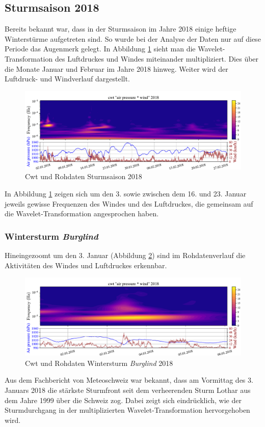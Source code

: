 \begin{refsection}
\newpage


\subsection{Sturmsaison 2018}
Bereits bekannt war, dass in der Sturmsaison im Jahre 2018 einige heftige Winterstürme aufgetreten sind.
So wurde bei der Analyse der Daten nur auf diese Periode das Augenmerk gelegt. 
In Abbildung \ref{fig:cwt_storm} \space sieht man die Wavelet-Transformation des Luftdruckes und Windes miteinander multipliziert.
Dies über die Monate Januar und Februar im Jahre 2018 hinweg.
Weiter wird der Luftdruck- und Windverlauf dargestellt.
 
\begin{figure}[h]
	\centering
	\includegraphics[width=1\textwidth]{papers/wwt/images/storm_airp_wind.pdf}
	\caption{Cwt und Rohdaten Sturmsaison 2018}
	\label{fig:cwt_storm}
\end{figure}

In Abbildung \ref{fig:cwt_storm} \space zeigen sich um den 3. sowie zwischen dem 16. und 23. Januar jeweils gewisse Frequenzen des Windes und des Luftdruckes, die gemeinsam auf die Wavelet-Transformation angesprochen haben.

\subsubsection{Wintersturm {\em Burglind} }
\label{burglind}
Hineingezoomt um den 3. Januar (Abbildung \ref{fig:cwt_storm_zoom}) sind im Rohdatenverlauf die Aktivitäten des Windes und Luftdruckes erkennbar. 
\begin{figure}[b]
	\centering
	\includegraphics[width=1\textwidth]{papers/wwt/images/storm_airp_wind_zoom.pdf}
	\caption{Cwt und Rohdaten Wintersturm {\em Burglind}  2018}
	\label{fig:cwt_storm_zoom}
\end{figure}
Aus dem Fachbericht \space \cite{Fachbericht:Burglind} von Meteoschweiz war bekannt, dass am Vormittag des 3. Januars 2018 die stärkste Sturmfront seit dem verheerenden Sturm Lothar aus dem Jahre 1999 über die Schweiz zog.
Dabei zeigt sich eindrücklich, wie der Sturmdurchgang in der multiplizierten Wavelet-Transformation hervorgehoben wird.


\end{refsection}

